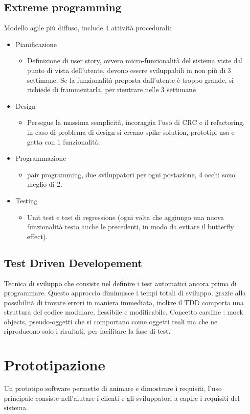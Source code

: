\documentclass[a4paper,12pt]{report}
\begin{document}
	\subsection{Extreme programming}
	Modello agile più diffuso, include 4 attività procedurali:
	\begin{itemize}
		\item Pianificazione
		\begin{itemize}
			\item Definizione di user story, ovvero micro-funzionalità del sistema viste dal punto di vista dell'utente, devono essere sviluppabili in non più di 3 settimane. Se la funzionalità proposta dall'utente è troppo grande, si richiede di frammentarla, per rientrare nelle 3 settimane
		\end{itemize}
		\item Design
		\begin{itemize}
			\item Persegue la massima semplicità, incoraggia l'uso di CRC e il refactoring, in caso di problema di design si creano spike solution, prototipi usa e getta con 1 funzionalità.
		\end{itemize}
	\item Programmazione
	\begin{itemize}
		\item pair programming, due sviluppatori per ogni postazione, 4 occhi sono meglio di 2.
	\end{itemize}
	\item Testing
	\begin{itemize}
		\item Unit test e test di regressione (ogni volta che aggiungo una nuova funzionalità testo anche le precedenti, in modo da evitare il butterfly effect).
	\end{itemize}
	\end{itemize}
	\subsection{Test Driven Developement}
	Tecnica di sviluppo che consiste nel definire i test automatici ancora prima di programmare. Questo approccio diminuisce i tempi totali di sviluppo, grazie alla possibilità di trovare errori in maniera immediata, inoltre il TDD comporta una struttura del codice modulare, flessibile e modificabile. Concetto cardine : mock objects, pseudo-oggetti che si comportano come oggetti reali ma che ne riproducono solo i risultati, per facilitare la fase di test.
	\section{Prototipazione}
	Un prototipo software permette di animare e dimostrare i requisiti, l'uso principale consiste nell'aiutare i clienti e gli sviluppatori a capire i requisiti del sistema.
\end{document}
